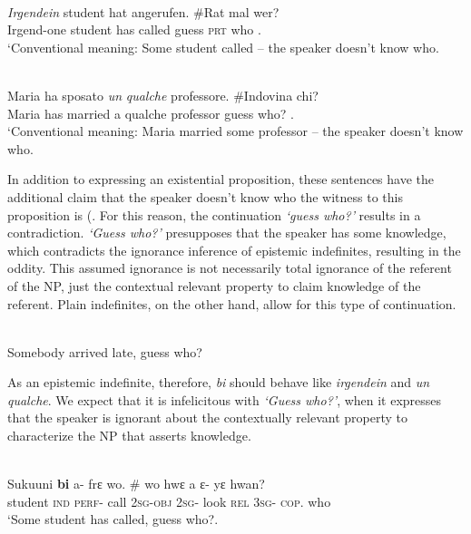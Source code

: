 \documentclass[output=paper,modfonts,nonflat,draftmode]{langsci/langscibook}
\begin{document}
\ea\label{owusu:ex26}\\
 \gll\emph{Irgendein} student hat angerufen. \#Rat mal wer?  \\
     Irgend-one student has called guess \textsc{prt} who .\\
\glt `Conventional meaning: Some student called – the speaker doesn’t know who.

\ex \label{owusu:ex28}\\
\gll Maria ha sposato \emph{un} \emph{qualche} professore. \#Indovina chi? \\
      Maria has married a qualche professor guess who? .\\
\glt `Conventional meaning: Maria married some professor – the speaker doesn’t know who.
\z 

In addition to expressing an existential proposition, these sentences have the additional claim that the speaker doesn't know who the witness to this proposition is (\citet{AloniPort2015}. For this reason, the continuation \emph{`guess who?'} results in a contradiction. \emph{`Guess who?'} presupposes that the speaker has some knowledge, which contradicts the ignorance inference of epistemic indefinites, resulting in the oddity.  This assumed ignorance is not necessarily total ignorance of the referent of the NP,  just the contextual relevant property to claim knowledge of the referent. Plain indefinites, on the other hand, allow for this type of continuation.

  \ea\label{owusu:ex26}\\
 Somebody arrived late, guess who?
 \z 
 
 As an epistemic indefinite, therefore, \emph{bi} should behave like \emph{irgendein} and \emph{un qualche}. We expect that it is infelicitous with \emph{`Guess who?'}, when it expresses that the speaker is ignorant about the contextually relevant property to characterize the NP that asserts knowledge.  


\ea {}\\
 \ea\label{owusu:ex30}
 \gll Sukuuni \textbf{bi} a- frε wo. \# wo hwε a ε- yε hwan? \\
     student \textsc{ind} \textsc{perf}- call       \textsc{2sg}-\textsc{obj} {} \textsc{2sg}- look  \textsc{rel} \textsc{3sg}- \textsc{cop}. who \\
\glt `Some student has called, guess who?.
\end{document}
